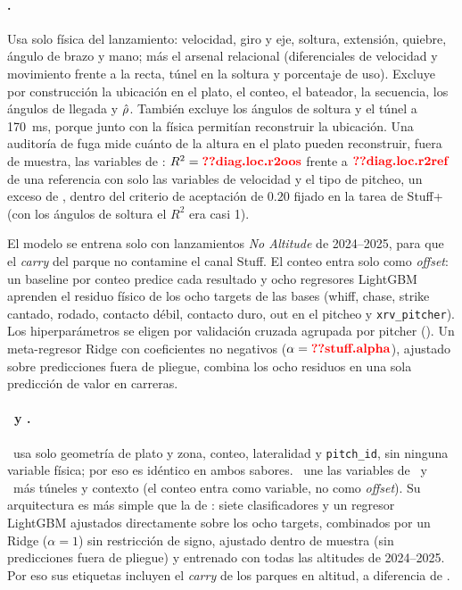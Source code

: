 \documentclass[10pt]{article}
\begin{document}
\paragraph{\splus.} Usa solo física del lanzamiento: velocidad, giro y eje, soltura, extensión, quiebre, ángulo de brazo y mano; más el arsenal relacional (diferenciales de velocidad y movimiento frente a la recta, túnel en la soltura y porcentaje de uso). Excluye por construcción la ubicación en el plato, el conteo, el bateador, la secuencia, los ángulos de llegada y $\hat{\rho}$. También excluye los ángulos de soltura y el túnel a 170~ms, porque junto con la física permitían reconstruir la ubicación. Una auditoría de fuga mide cuánto de la altura en el plato pueden reconstruir, fuera de muestra, las variables de \splus: $R^2=\cf{diag.loc.r2oos}$ frente a $\cf{diag.loc.r2ref}$ de una referencia con solo las variables de velocidad y el tipo de pitcheo, un exceso de , dentro del criterio de aceptación de $0.20$ fijado en la tarea de Stuff+ (con los ángulos de soltura el $R^2$ era casi 1).

El modelo se entrena solo con lanzamientos \emph{No Altitude} de 2024--2025, para que el \emph{carry} del parque no contamine el canal Stuff. El conteo entra solo como \emph{offset}: un baseline por conteo predice cada resultado y ocho regresores LightGBM aprenden el residuo físico de los ocho targets de las bases (whiff, chase, strike cantado, rodado, contacto débil, contacto duro, out en el pitcheo y \texttt{xrv\_pitcher}). Los hiperparámetros se eligen por validación cruzada agrupada por pitcher (). Un meta-regresor Ridge con coeficientes no negativos ($\alpha=\cf{stuff.alpha}$), ajustado sobre predicciones fuera de pliegue, combina los ocho residuos en una sola predicción de valor en carreras.

\paragraph{\lplus\ y \pplus.} \lplus\ usa solo geometría de plato y zona, conteo, lateralidad y \texttt{pitch\_id}, sin ninguna variable física; por eso es idéntico en ambos sabores. \pplus\ une las variables de \splus\ y \lplus\ más túneles y contexto (el conteo entra como variable, no como \emph{offset}). Su arquitectura es más simple que la de \splus: siete clasificadores y un regresor LightGBM ajustados directamente sobre los ocho targets, combinados por un Ridge ($\alpha=1$) sin restricción de signo, ajustado dentro de muestra (sin predicciones fuera de pliegue) y entrenado con todas las altitudes de 2024--2025. Por eso sus etiquetas incluyen el \emph{carry} de los parques en altitud, a diferencia de \splus.
\end{document}
